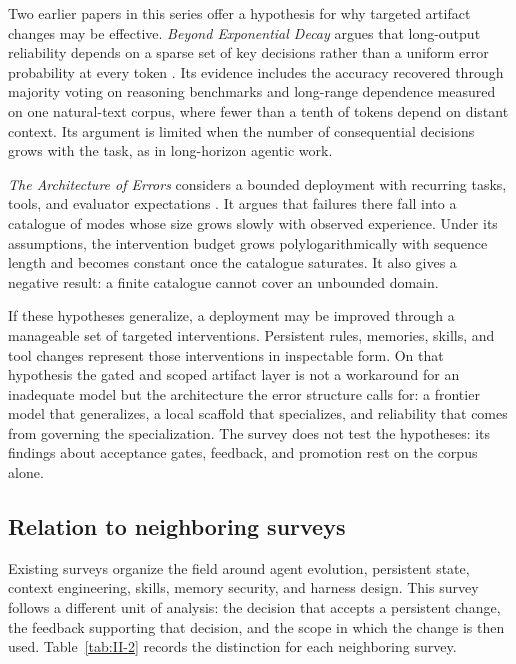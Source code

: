 Two earlier papers in this series offer a hypothesis for why targeted artifact changes may be effective. \emph{Beyond Exponential Decay} argues that long-output reliability depends on a sparse set of key decisions rather than a uniform error probability at every token \cite{arbuzov2025beyond}. Its evidence includes the accuracy recovered through majority voting on reasoning benchmarks and long-range dependence measured on one natural-text corpus, where fewer than a tenth of tokens depend on distant context. Its argument is limited when the number of consequential decisions grows with the task, as in long-horizon agentic work.

\emph{The Architecture of Errors} considers a bounded deployment with recurring tasks, tools, and evaluator expectations \cite{arbuzov2026architecture}. It argues that failures there fall into a catalogue of modes whose size grows slowly with observed experience. Under its assumptions, the intervention budget grows polylogarithmically with sequence length and becomes constant once the catalogue saturates. It also gives a negative result: a finite catalogue cannot cover an unbounded domain.

If these hypotheses generalize, a deployment may be improved through a manageable set of targeted interventions. Persistent rules, memories, skills, and tool changes represent those interventions in inspectable form. On that hypothesis the gated and scoped artifact layer is not a workaround for an inadequate model but the architecture the error structure calls for: a frontier model that generalizes, a local scaffold that specializes, and reliability that comes from governing the specialization. The survey does not test the hypotheses: its findings about acceptance gates, feedback, and promotion rest on the corpus alone.

\subsection{Relation to neighboring surveys}\label{relation-to-neighboring-surveys}

Existing surveys organize the field around agent evolution, persistent state, context engineering, skills, memory security, and harness design. This survey follows a different unit of analysis: the decision that accepts a persistent change, the feedback supporting that decision, and the scope in which the change is then used. Table~\ref{tab:II-2} records the distinction for each neighboring survey.

